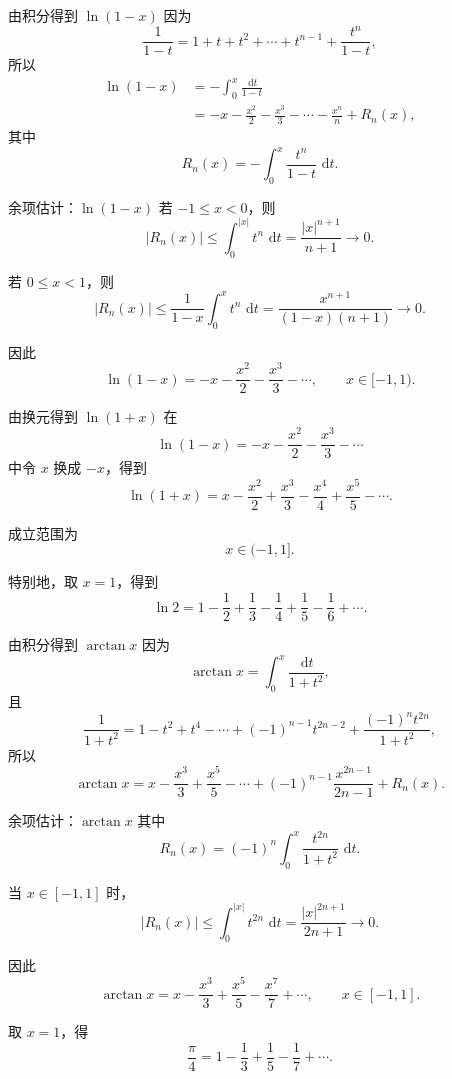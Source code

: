 \documentclass[aspectratio=169,11pt]{ctexbeamer}
\newcommand{\dd}{\,\mathrm{d}}
\newcommand{\abs}[1]{\left|#1\right|}
\begin{document}
\begin{frame}{由积分得到 $\ln(1-x)$}
\small
因为
\[
  \frac1{1-t}=1+t+t^2+\cdots+t^{n-1}+\frac{t^n}{1-t},
\]
所以
\[
\begin{aligned}
\ln(1-x)
&=-\int_0^x\frac{\dd t}{1-t}\\
&=-x-\frac{x^2}{2}-\frac{x^3}{3}
  -\cdots-\frac{x^n}{n}
  +R_n(x),
\end{aligned}
\]
其中
\[
  R_n(x)=-\int_0^x\frac{t^n}{1-t}\,\dd t.
\]
\end{frame}

\begin{frame}{余项估计：$\ln(1-x)$}
\small
若 $-1\le x<0$，则
\[
  \abs{R_n(x)}
  \le
  \int_0^{\abs{x}}t^n\,\dd t
  =
  \frac{\abs{x}^{n+1}}{n+1}\to0.
\]

若 $0\le x<1$，则
\[
  \abs{R_n(x)}
  \le
  \frac1{1-x}\int_0^x t^n\,\dd t
  =
  \frac{x^{n+1}}{(1-x)(n+1)}\to0.
\]

因此
\[
  \ln(1-x)=-x-\frac{x^2}{2}-\frac{x^3}{3}-\cdots,\qquad x\in[-1,1).
\]
\end{frame}

\begin{frame}{由换元得到 $\ln(1+x)$}
\small
在
\[
  \ln(1-x)=-x-\frac{x^2}{2}-\frac{x^3}{3}-\cdots
\]
中令 $x$ 换成 $-x$，得到
\[
  \ln(1+x)
  =
  x-\frac{x^2}{2}+\frac{x^3}{3}
  -\frac{x^4}{4}+\frac{x^5}{5}-\cdots.
\]

成立范围为
\[
  x\in(-1,1].
\]

特别地，取 $x=1$，得到
\[
  \ln2=1-\frac12+\frac13-\frac14+\frac15-\frac16+\cdots.
\]
\end{frame}

\begin{frame}{由积分得到 $\arctan x$}
\small
因为
\[
  \arctan x=\int_0^x\frac{\dd t}{1+t^2},
\]
且
\[
  \frac1{1+t^2}
  =
  1-t^2+t^4-\cdots+(-1)^{n-1}t^{2n-2}
  +\frac{(-1)^nt^{2n}}{1+t^2},
\]
所以
\[
  \arctan x
  =
  x-\frac{x^3}{3}+\frac{x^5}{5}
  -\cdots+(-1)^{n-1}\frac{x^{2n-1}}{2n-1}
  +R_n(x).
\]
\end{frame}

\begin{frame}{余项估计：$\arctan x$}
\small
其中
\[
  R_n(x)=(-1)^n\int_0^x\frac{t^{2n}}{1+t^2}\,\dd t.
\]

当 $x\in[-1,1]$ 时，
\[
  \abs{R_n(x)}
  \le
  \int_0^{\abs{x}}t^{2n}\,\dd t
  =
  \frac{\abs{x}^{2n+1}}{2n+1}\to0.
\]

因此
\[
  \arctan x=x-\frac{x^3}{3}+\frac{x^5}{5}-\frac{x^7}{7}+\cdots,
  \qquad x\in[-1,1].
\]

取 $x=1$，得
\[
  \frac\pi4=1-\frac13+\frac15-\frac17+\cdots.
\]
\end{frame}
\end{document}
